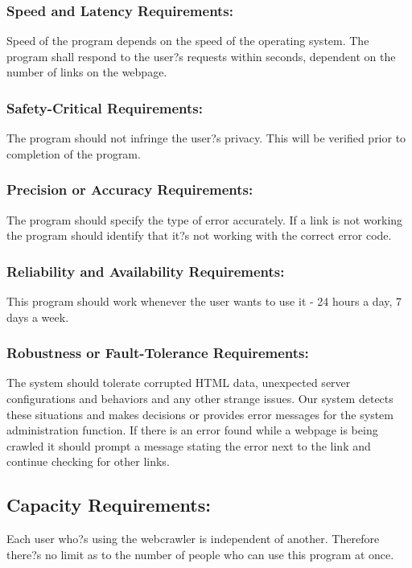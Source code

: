\documentclass[12pt]{article}
\begin{document}
\subsubsection{Speed and Latency Requirements:}
Speed of the program depends on the speed of the operating system. The program shall respond to the user?s requests within seconds, dependent on the number of links on the webpage. 

\subsubsection{Safety-Critical Requirements: }The program should not infringe the user?s privacy. 
This will be verified prior to completion of the program.

\subsubsection{Precision or Accuracy Requirements:}
The program should specify the type of error accurately. If a link is not working the program should identify that it?s not working with the correct error code.

\subsubsection{Reliability and Availability Requirements:}

This program should work whenever the user wants to use it - 24 hours a day, 7 days a week.

\subsubsection{Robustness or Fault-Tolerance Requirements:}
The system should tolerate corrupted HTML data, unexpected server configurations and behaviors and any other strange issues. Our system detects these situations and makes decisions or provides error messages for the system administration function.
If there is an error found while a webpage is being crawled it should prompt a message stating the error next to the link and continue checking for other links.

\subsection{Capacity Requirements:}
Each user who?s using the webcrawler is independent of another. Therefore there?s no limit as to the number of people who can use this program at once.
\end{document}
